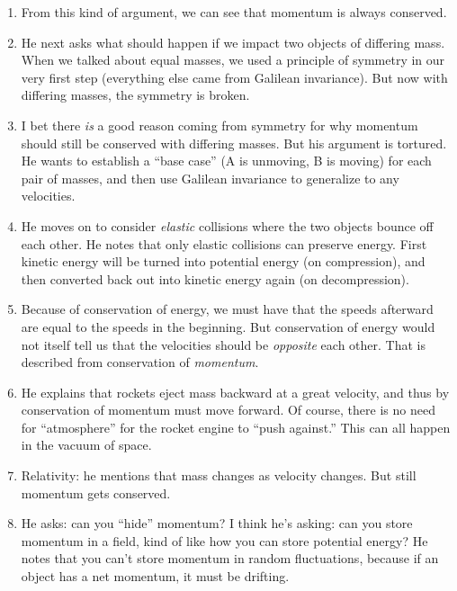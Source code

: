 \begin{enumerate}
  \item From this kind of argument, we can see that momentum is always
  conserved.

  \item He next asks what should happen if we impact two objects of
  differing mass. When we talked about equal masses, we used a principle
  of symmetry in our very first step (everything else came from Galilean
  invariance). But now with differing masses, the symmetry is broken.

  \item I bet there \emph{is} a good reason coming from symmetry for why
  momentum should still be conserved with differing masses. But his
  argument is tortured. He wants to establish a ``base case'' (A is
  unmoving, B is moving) for each pair of masses, and then use Galilean
  invariance to generalize to any velocities.

  \item He moves on to consider \emph{elastic} collisions where the two
  objects bounce off each other. He notes that only elastic collisions
  can preserve energy. First kinetic energy will be turned into
  potential energy (on compression), and then converted back out into
  kinetic energy again (on decompression).

  \item Because of conservation of energy, we must have that the speeds
  afterward are equal to the speeds in the beginning. But conservation
  of energy would not itself tell us that the velocities should be
  \emph{opposite} each other. That is described from conservation of
  \emph{momentum}.

  \item He explains that rockets eject mass backward at a great
  velocity, and thus by conservation of momentum must move forward. Of
  course, there is no need for ``atmosphere'' for the rocket engine to
  ``push against.'' This can all happen in the vacuum of space.

  \item Relativity: he mentions that mass changes as velocity changes.
  But still momentum gets conserved.

  \item He asks: can you ``hide'' momentum? I think he's asking: can you
  store momentum in a field, kind of like how you can store potential
  energy? He notes that you can't store momentum in random fluctuations,
  because if an object has a net momentum, it must be drifting.


\end{enumerate}
